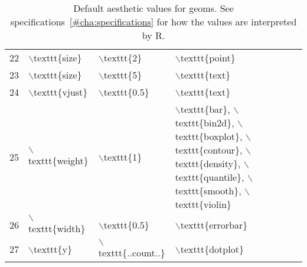 \begin{table}[ht]
\begin{tabular}{rlll}
  22 & $\backslash$texttt\{size\} & $\backslash$texttt\{2\} & $\backslash$texttt\{point\} \\ 
  23 & $\backslash$texttt\{size\} & $\backslash$texttt\{5\} & $\backslash$texttt\{text\} \\ 
  24 & $\backslash$texttt\{vjust\} & $\backslash$texttt\{0.5\} & $\backslash$texttt\{text\} \\ 
  25 & $\backslash$texttt\{weight\} & $\backslash$texttt\{1\} & $\backslash$texttt\{bar\}, $\backslash$texttt\{bin2d\}, $\backslash$texttt\{boxplot\}, $\backslash$texttt\{contour\}, $\backslash$texttt\{density\}, $\backslash$texttt\{quantile\}, $\backslash$texttt\{smooth\}, $\backslash$texttt\{violin\} \\ 
  26 & $\backslash$texttt\{width\} & $\backslash$texttt\{0.5\} & $\backslash$texttt\{errorbar\} \\ 
  27 & $\backslash$texttt\{y\} & $\backslash$texttt\{..count..\} & $\backslash$texttt\{dotplot\} \\ 
   \hline
\end{tabular}
\caption{Default aesthetic values for geoms. See specifications~\ref{#cha:specifications} for how the values are interpreted by R.} 
\label{tbl:geom-defaults}
\end{table}
